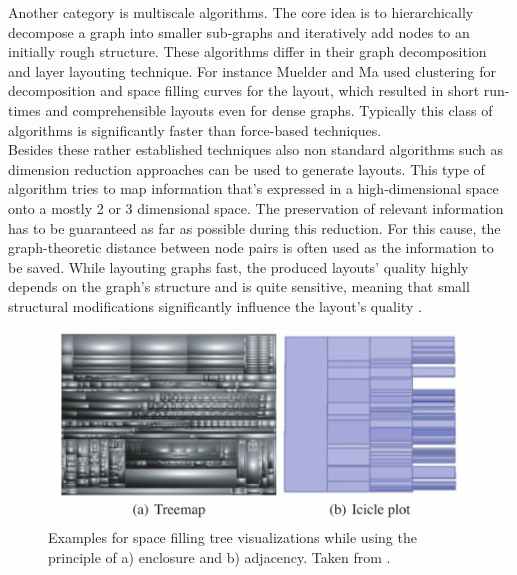 Another category is multiscale algorithms. The core idea is to hierarchically decompose a graph into smaller sub-graphs and iteratively add nodes to an initially rough structure. These algorithms differ in their graph decomposition and layer layouting technique. For instance Muelder and Ma \cite{Muelder2008} used clustering for decomposition and space filling curves for the layout, which resulted in short run-times and comprehensible layouts even for dense graphs. Typically this class of algorithms is significantly faster than force-based techniques\cite{VonLandesberger2011}. \\
Besides these rather established techniques also non standard algorithms such as dimension reduction approaches can be used to generate layouts. This type of algorithm tries to map information that's expressed in a high-dimensional space onto a mostly 2 or 3 dimensional space. The preservation of relevant information has to be guaranteed as far as possible during this reduction. For this cause, the graph-theoretic distance between node pairs is often used as the information to be saved. While layouting graphs fast, the produced layouts' quality highly depends on the graph's structure and is quite sensitive, meaning that small structural modifications significantly influence the layout's quality \cite{Gibson2013} \cite{VonLandesberger2011}.

\begin{figure}
    \centering
    \includegraphics[scale=1]{media/space_filling_trees.pdf}
    \caption{Examples for space filling tree visualizations while using the principle of a) enclosure and b) adjacency. Taken from \cite{VonLandesberger2011}.}
    \label{fig:space_filling_trees}
\end{figure}

